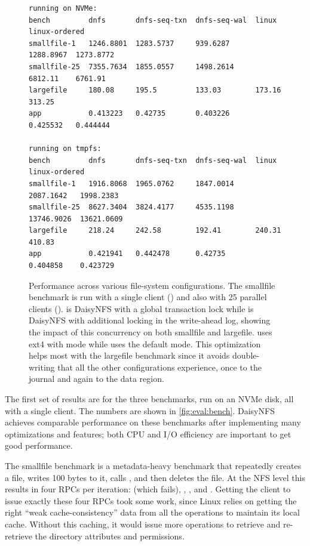 \begin{figure}
  \begin{verbatim}
running on NVMe:
bench         dnfs       dnfs-seq-txn  dnfs-seq-wal  linux      linux-ordered
smallfile-1   1246.8801  1283.5737     939.6287      1288.8967  1273.8772
smallfile-25  7355.7634  1855.0557     1498.2614     6812.11    6761.91
largefile     180.08     195.5         133.03        173.16     313.25
app           0.413223   0.42735       0.403226      0.425532   0.444444

running on tmpfs:
bench         dnfs       dnfs-seq-txn  dnfs-seq-wal  linux       linux-ordered
smallfile-1   1916.8068  1965.0762     1847.0014     2087.1642   1998.2383
smallfile-25  8627.3404  3824.4177     4535.1198     13746.9026  13621.0609
largefile     218.24     242.58        192.41        240.31      410.83
app           0.421941   0.442478      0.42735       0.404858    0.423729
\end{verbatim}
  \caption{Performance across various file-system configurations. The smallfile
    benchmark is run with a single client () and also with 25
    parallel clients ().  is DaisyNFS with a
    global transaction lock while  is DaisyNFS with additional
    locking in the write-ahead log, showing the impact of this concurrency on
    both smallfile and largefile.  uses ext4 with 
    mode while  uses the default  mode. This
    optimization helps most with the largefile benchmark since it avoids
    double-writing that all the other configurations experience, once to the
    journal and again to the data region.}
  \label{fig:bench-configs}
\end{figure}

The first set of results are for the three benchmarks, run on an NVMe disk, all
with a single client. The numbers are shown in \cref{fig:eval:bench}. DaisyNFS
achieves comparable performance on these benchmarks after implementing many
optimizations and features; both CPU and I/O efficiency are important to get
good performance.

The smallfile benchmark is a metadata-heavy benchmark that repeatedly creates a
file, writes 100 bytes to it, calls , and then deletes the file. At
the NFS level this results in four RPCs per iteration:  (which
fails), , , and . Getting the client to issue
exactly these four RPCs took some work, since Linux relies on getting the right
``weak cache-consistency'' data from all the operations to maintain its local
cache. Without this caching, it would issue more operations to retrieve and
re-retrieve the directory attributes and permissions.

